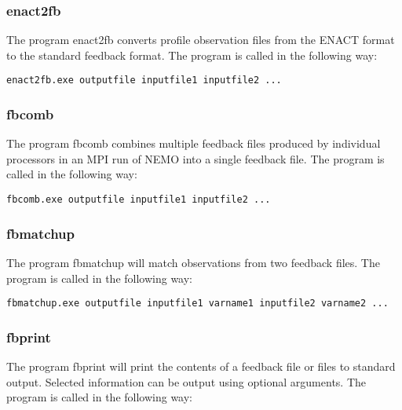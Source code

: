 \documentclass[NEMO_book]{subfiles}
\begin{document}
\subsubsection{enact2fb}

The program enact2fb converts profile observation files from the ENACT format to the standard
feedback format. The program is called in the following way:

\begin{alltt}
\footnotesize
\begin{verbatim}
enact2fb.exe outputfile inputfile1 inputfile2 ...
\end{verbatim}
\end{alltt}

\subsubsection{fbcomb}

The program fbcomb combines multiple feedback files produced by individual processors in an
MPI run of NEMO into a single feedback file. The program is called in the following way:

\begin{alltt}
\footnotesize
\begin{verbatim}
fbcomb.exe outputfile inputfile1 inputfile2 ...
\end{verbatim}
\end{alltt}

\subsubsection{fbmatchup}

The program fbmatchup will match observations from two feedback files. The program is called
in the following way:

\begin{alltt}
\footnotesize
\begin{verbatim}
fbmatchup.exe outputfile inputfile1 varname1 inputfile2 varname2 ...
\end{verbatim}
\end{alltt}


\subsubsection{fbprint}

The program fbprint will print the contents of a feedback file or files to standard output.
Selected information can be output using optional arguments. The program is called in the
following way:
\end{document}

